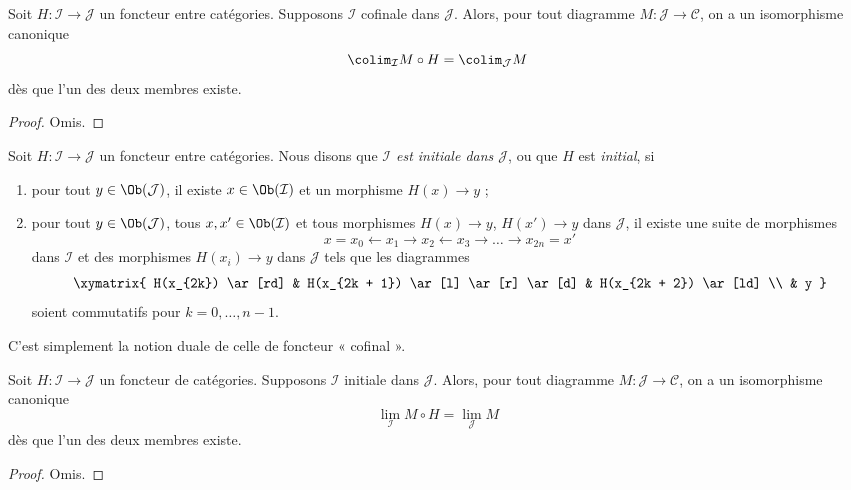 \begin{lemma}
\label{lemma-cofinal}
Soit $H : \mathcal{I} \to \mathcal{J}$ un foncteur entre catégories.
Supposons $\mathcal{I}$ cofinale dans $\mathcal{J}$. Alors, pour tout
diagramme $M : \mathcal{J} \to \mathcal{C}$, on a un isomorphisme canonique
$$
\colim_\mathcal{I} M \circ H
=
\colim_\mathcal{J} M
$$
dès que l'un des deux membres existe.
\end{lemma}

\begin{proof}
Omis.
\end{proof}

\begin{definition}
\label{definition-initial}
Soit $H : \mathcal{I} \to \mathcal{J}$ un foncteur entre catégories.
Nous disons que {\it $\mathcal{I}$ est initiale dans $\mathcal{J}$},
ou que $H$ est {\it initial}, si
\begin{enumerate}
\item pour tout $y \in \Ob(\mathcal{J})$, il existe
$x \in \Ob(\mathcal{I})$ et un morphisme $H(x) \to y$ ;
\item pour tout $y \in \Ob(\mathcal{J})$, tous
$x , x' \in \Ob(\mathcal{I})$ et tous morphismes
$H(x) \to y$, $H(x') \to y$ dans $\mathcal{J}$,
il existe une suite de morphismes
$$
x = x_0 \leftarrow x_1 \rightarrow x_2 \leftarrow x_3 \rightarrow \ldots
\rightarrow x_{2n} = x'
$$
dans $\mathcal{I}$ et des morphismes $H(x_i) \to y$ dans $\mathcal{J}$
tels que les diagrammes
$$
\xymatrix{
H(x_{2k}) \ar[rd] &
H(x_{2k + 1}) \ar[l] \ar[r] \ar[d] &
H(x_{2k + 2}) \ar[ld] \\
& y
}
$$
soient commutatifs pour $k = 0, \ldots, n - 1$.
\end{enumerate}
\end{definition}

\noindent
C'est simplement la notion duale de celle de foncteur « cofinal ».

\begin{lemma}
\label{lemma-initial}
Soit $H : \mathcal{I} \to \mathcal{J}$ un foncteur de catégories.
Supposons $\mathcal{I}$ initiale dans $\mathcal{J}$.
Alors, pour tout diagramme $M : \mathcal{J} \to \mathcal{C}$,
on a un isomorphisme canonique
$$
\lim_\mathcal{I} M \circ H = \lim_\mathcal{J} M
$$
dès que l'un des deux membres existe.
\end{lemma}

\begin{proof}
Omis.
\end{proof}

